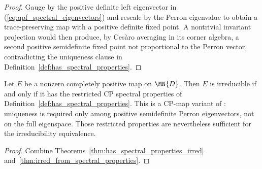 \begin{proof}
    \leanok
    Gauge by the positive definite left eigenvector in
    (\ref{eq:qpf_spectral_eigenvectors}) and rescale by the Perron eigenvalue
    to obtain a trace-preserving map with a positive definite fixed point.
    A nontrivial invariant projection would then produce, by Ces\`aro averaging
    in its corner algebra, a second positive semidefinite fixed point not
    proportional to the Perron vector, contradicting the uniqueness clause in
    Definition~\ref{def:has_spectral_properties}.
\end{proof}

\begin{theorem}
    \label{thm:irred_iff_spectral_properties}
    \leanok
    Let $E$ be a nonzero completely positive map on $\MN{D}$.
    Then $E$ is irreducible if and only if it has the restricted CP spectral properties of
    Definition~\ref{def:has_spectral_properties}. This is a CP-map variant of
    \cite[Theorem~6.4]{Wolf2012Quantum}: uniqueness is required only among
    positive semidefinite Perron eigenvectors, not on the full eigenspace.
    Those restricted properties are nevertheless sufficient for the
    irreducibility equivalence.
\end{theorem}

\begin{proof}
    \leanok
    Combine Theorems~\ref{thm:has_spectral_properties_irred}
    and~\ref{thm:irred_from_spectral_properties}.
\end{proof}

